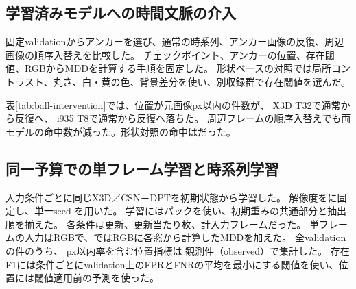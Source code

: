 \begin{table}[tbp]
\centering
\caption{既存の長系列validationでの代表比較。位置の単位は元画像px、採点対象は観測フレーム。
逐次学習の行は累積更新数、容量比較の行はquery学習の更新数を示す。}
\label{tab:ball-history}
\small

\end{table}

\subsection{学習済みモデルへの時間文脈の介入}

固定validationからアンカーを選び、通常の時系列、アンカー画像の反復、周辺画像の順序入替えを比較した。
チェックポイント、アンカーの位置、存在閾値、RGBからMDDを計算する手順を固定した。
形状ベースの対照では局所コントラスト、丸さ、白・黄の色、背景差分を使い、別収録群で存在閾値を選んだ。

表\ref{tab:ball-intervention}では、位置が元画像px以内の件数が、
X3D T32で通常から反復へ、
i935 T8で通常から反復へ落ちた。
周辺フレームの順序入替えでも両モデルの命中数が減った。形状対照の命中はだった。

\begin{table}[tbp]
\centering
\caption{固定アンカーに対する推論時の介入。観測件で閾値適用前の位置予測と存在の偽陰性を、
確認不在件で存在の偽陽性を採点する。
X3Dと形状対照は、i935は。}
\label{tab:ball-intervention}
\small

\end{table}

\subsection{同一予算での単フレーム学習と時系列学習}

入力条件ごとに同じX3D／CSN＋DPTを初期状態から学習した。
解像度をに固定し、単一seed を用いた。
学習にはパックを使い、初期重みの共通部分と抽出順を揃えた。
各条件は更新、更新当たり枚、計入力フレームだった。
単フレームの入力はRGBで、ではRGBに各窓から計算したMDDを加えた。
全validationの件のうち、 px以内率を含む位置指標は
観測件（observed）で集計した。
存在F1には条件ごとにvalidation上のFPRとFNRの平均を最小にする閾値を使い、位置には閾値適用前の予測を使った。


